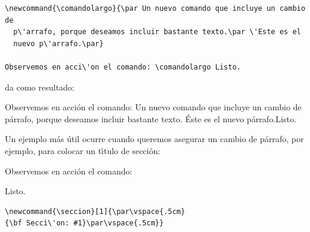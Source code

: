 {\vspace{.3cm}
{\small
\begin{minipage}[t]{10cm}
\begin{verbatim}
\newcommand{\comandolargo}{\par Un nuevo comando que incluye un cambio de
  p\'arrafo, porque deseamos incluir bastante texto.\par \'Este es el
  nuevo p\'arrafo.\par}

Observemos en acci\'on el comando: \comandolargo Listo.
\end{verbatim}
\end{minipage}
}
\vspace{.3cm}

\noindent
da como resultado:

\hspace{3cm}\vspace{.3cm}
{\small
\begin{minipage}[t]{10cm}
\newcommand{\comandolargo}{\newline\hspace*{.5em}
 Un nuevo comando que incluye un cambio de
  p\'arrafo, porque deseamos incluir bastante
  texto.\newline\hspace*{.5em} 
\'Este es el
  nuevo p\'arrafo.\newline}

Observemos en acci\'on el comando: \comandolargo \hspace*{.8em}Listo.
\end{minipage}
}
\vspace{.6cm}

Un ejemplo m\'as \'util ocurre cuando queremos asegurar un cambio de
p\'arrafo, por ejemplo, para colocar un t\'{\i}tulo de secci\'on:

\vspace{.3cm}
{\small
\begin{minipage}[t]{5cm}
\newcommand{\seccion}[1]{\par\vspace{.5cm}{\bf Secci\'on: #1}\par\vspace{.5cm}}

Observemos en acci\'on el comando: \seccion{Ejemplo} Listo.
\end{minipage}
\hspace{1.5cm}
\begin{minipage}[t]{5cm}
\begin{verbatim}
\newcommand{\seccion}[1]{\par\vspace{.5cm}
{\bf Secci\'on: #1}\par\vspace{.5cm}}


\end{verbatim}
\end{minipage}}}
